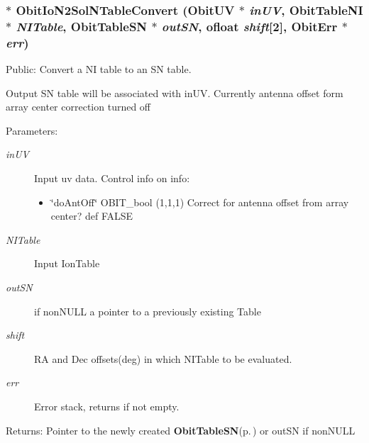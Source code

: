 \subsubsection{$\ast$ Obit\-Io\-N2Sol\-NTable\-Convert ({\bf Obit\-UV} $\ast$ {\em in\-UV}, {\bf Obit\-Table\-NI} $\ast$ {\em NITable}, {\bf Obit\-Table\-SN} $\ast$ {\em out\-SN}, {\bf ofloat} {\em shift}[2], {\bf Obit\-Err} $\ast$ {\em err})}\label{ObitIoN2SolNTable_8h_a0}


Public: Convert a NI table to an SN table. 

Output SN table will be associated with in\-UV. Currently antenna offset form array center correction turned off \begin{Desc}
\item[Parameters:]
\begin{description}
\item[{\em in\-UV}]Input uv data. Control info on info: \begin{itemize}
\item \char`\"{}do\-Ant\-Off\char`\"{} OBIT\_\-bool (1,1,1) Correct for antenna offset from array center? def FALSE \end{itemize}
\item[{\em NITable}]Input Ion\-Table \item[{\em out\-SN}]if non\-NULL a pointer to a previously existing Table \item[{\em shift}]RA and Dec offsets(deg) in which NITable to be evaluated. \item[{\em err}]Error stack, returns if not empty. \end{description}
\end{Desc}
\begin{Desc}
\item[Returns:]Pointer to the newly created {\bf Obit\-Table\-SN}{\rm (p.\,\pageref{structObitTableSN})} or out\-SN if non\-NULL \end{Desc}

